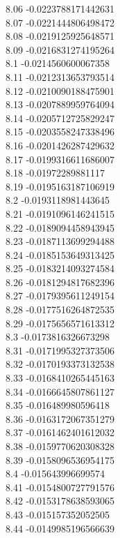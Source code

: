 {8.06	-0.0223788171442631\\
8.07	-0.0221444806498472\\
8.08	-0.0219125925648571\\
8.09	-0.0216831274195264\\
8.1	-0.0214560600067358\\
8.11	-0.0212313653793514\\
8.12	-0.0210090188475901\\
8.13	-0.0207889959764094\\
8.14	-0.0205712725829247\\
8.15	-0.0203558247338496\\
8.16	-0.0201426287429632\\
8.17	-0.0199316611686007\\
8.18	-0.01972289881117\\
8.19	-0.0195163187106919\\
8.2	-0.0193118981443645\\
8.21	-0.0191096146241515\\
8.22	-0.0189094458943945\\
8.23	-0.0187113699294488\\
8.24	-0.0185153649313425\\
8.25	-0.0183214093274584\\
8.26	-0.0181294817682396\\
8.27	-0.0179395611249154\\
8.28	-0.0177516264872535\\
8.29	-0.0175656571613312\\
8.3	-0.0173816326673298\\
8.31	-0.0171995327373506\\
8.32	-0.0170193373132538\\
8.33	-0.0168410265445163\\
8.34	-0.0166645807861127\\
8.35	-0.016489980596418\\
8.36	-0.0163172067351279\\
8.37	-0.0161462401612032\\
8.38	-0.0159770620308328\\
8.39	-0.0158096536954175\\
8.4	-0.015643996699574\\
8.41	-0.0154800727791576\\
8.42	-0.0153178638593065\\
8.43	-0.015157352052505\\
8.44	-0.0149985196566639\\
}
